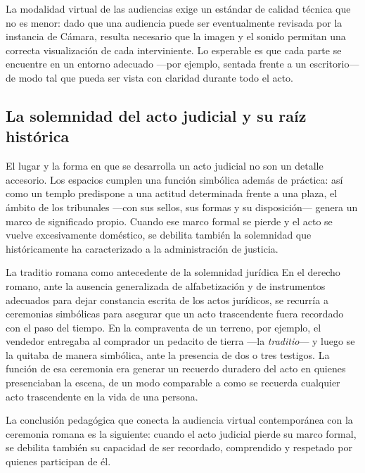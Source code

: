 \documentclass[12pt,oneside]{book}
\begin{document}
La modalidad virtual de las audiencias exige un estándar de calidad técnica que no es menor: dado que una audiencia puede ser eventualmente revisada por la instancia de Cámara, resulta necesario que la imagen y el sonido permitan una correcta visualización de cada interviniente. Lo esperable es que cada parte se encuentre en un entorno adecuado —por ejemplo, sentada frente a un escritorio— de modo tal que pueda ser vista con claridad durante todo el acto.

\subsection{La solemnidad del acto judicial y su raíz histórica}

El lugar y la forma en que se desarrolla un acto judicial no son un detalle accesorio. Los espacios cumplen una función simbólica además de práctica: así como un templo predispone a una actitud determinada frente a una plaza, el ámbito de los tribunales —con sus sellos, sus formas y su disposición— genera un marco de significado propio. Cuando ese marco formal se pierde y el acto se vuelve excesivamente doméstico, se debilita también la solemnidad que históricamente ha caracterizado a la administración de justicia.

\begin{example}{La traditio romana como antecedente de la solemnidad jurídica}
En el derecho romano, ante la ausencia generalizada de alfabetización y de instrumentos adecuados para dejar constancia escrita de los actos jurídicos, se recurría a ceremonias simbólicas para asegurar que un acto trascendente fuera recordado con el paso del tiempo. En la compraventa de un terreno, por ejemplo, el vendedor entregaba al comprador un pedacito de tierra —la \textit{traditio}— y luego se la quitaba de manera simbólica, ante la presencia de dos o tres testigos. La función de esa ceremonia era generar un recuerdo duradero del acto en quienes presenciaban la escena, de un modo comparable a como se recuerda cualquier acto trascendente en la vida de una persona.
\end{example}

La conclusión pedagógica que conecta la audiencia virtual contemporánea con la ceremonia romana es la siguiente: cuando el acto judicial pierde su marco formal, se debilita también su capacidad de ser recordado, comprendido y respetado por quienes participan de él.

\end{document}
